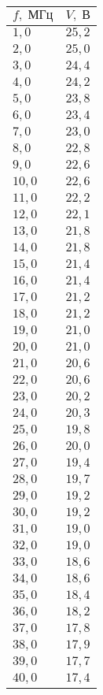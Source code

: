 \begin{tabular}{|l|l|}
\hline
$f,\;\text{МГц}$ & $V,\;\text{В}$\\\hline
$1{,}0$ & $25{,}2$\\\hline
$2{,}0$ & $25{,}0$\\\hline
$3{,}0$ & $24{,}4$\\\hline
$4{,}0$ & $24{,}2$\\\hline
$5{,}0$ & $23{,}8$\\\hline
$6{,}0$ & $23{,}4$\\\hline
$7{,}0$ & $23{,}0$\\\hline
$8{,}0$ & $22{,}8$\\\hline
$9{,}0$ & $22{,}6$\\\hline
$10{,}0$ & $22{,}6$\\\hline
$11{,}0$ & $22{,}2$\\\hline
$12{,}0$ & $22{,}1$\\\hline
$13{,}0$ & $21{,}8$\\\hline
$14{,}0$ & $21{,}8$\\\hline
$15{,}0$ & $21{,}4$\\\hline
$16{,}0$ & $21{,}4$\\\hline
$17{,}0$ & $21{,}2$\\\hline
$18{,}0$ & $21{,}2$\\\hline
$19{,}0$ & $21{,}0$\\\hline
$20{,}0$ & $21{,}0$\\\hline
$21{,}0$ & $20{,}6$\\\hline
$22{,}0$ & $20{,}6$\\\hline
$23{,}0$ & $20{,}2$\\\hline
$24{,}0$ & $20{,}3$\\\hline
$25{,}0$ & $19{,}8$\\\hline
$26{,}0$ & $20{,}0$\\\hline
$27{,}0$ & $19{,}4$\\\hline
$28{,}0$ & $19{,}7$\\\hline
$29{,}0$ & $19{,}2$\\\hline
$30{,}0$ & $19{,}2$\\\hline
$31{,}0$ & $19{,}0$\\\hline
$32{,}0$ & $19{,}0$\\\hline
$33{,}0$ & $18{,}6$\\\hline
$34{,}0$ & $18{,}6$\\\hline
$35{,}0$ & $18{,}4$\\\hline
$36{,}0$ & $18{,}2$\\\hline
$37{,}0$ & $17{,}8$\\\hline
$38{,}0$ & $17{,}9$\\\hline
$39{,}0$ & $17{,}7$\\\hline
$40{,}0$ & $17{,}4$\\\hline
\end{tabular}
